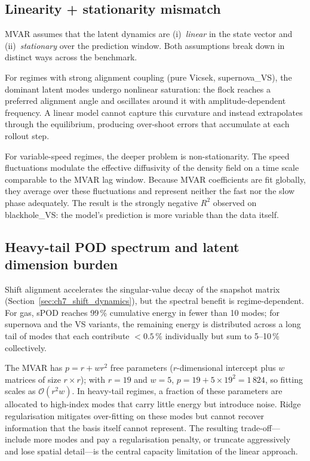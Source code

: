 \subsection{Linearity + stationarity mismatch}

MVAR assumes that the latent dynamics are (i)~\emph{linear} in the
state vector and (ii)~\emph{stationary} over the prediction window.
Both assumptions break down in distinct ways across the benchmark.

For regimes with strong alignment coupling (pure Vicsek,
supernova\_VS), the dominant latent modes undergo nonlinear saturation:
the flock reaches a preferred alignment angle and oscillates around it
with amplitude-dependent frequency.  A linear model cannot capture this
curvature and instead extrapolates through the equilibrium, producing
over-shoot errors that accumulate at each rollout step.

For variable-speed regimes, the deeper problem is non-stationarity.
The speed fluctuations modulate the effective diffusivity of the
density field on a time scale comparable to the MVAR lag window.
Because MVAR coefficients are fit globally, they average over these
fluctuations and represent neither the fast nor the slow phase
adequately.  The result is the strongly negative $R^2$ observed on
blackhole\_VS: the model's prediction is more variable than the data
itself.

\subsection{Heavy-tail POD spectrum and latent dimension burden}

Shift alignment accelerates the singular-value decay of the snapshot
matrix (Section~\ref{sec:ch7_shift_dynamics}), but the spectral benefit
is regime-dependent.  For gas, sPOD reaches 99\,\% cumulative energy in
fewer than 10 modes; for supernova and the VS variants, the remaining
energy is distributed across a long tail of modes that each contribute
$<0.5\,\%$ individually but sum to 5--10\,\% collectively.

The MVAR has $p = r + wr^2$ free parameters ($r$-dimensional intercept
plus $w$ matrices of size $r\times r$); with $r=19$ and $w=5$,
$p = 19 + 5\times19^2 = 1\,824$, so fitting scales as $\mathcal{O}(r^2 w)$.
In heavy-tail regimes, a fraction of these parameters are
allocated to high-index modes that carry little energy but introduce
noise.  Ridge regularisation mitigates over-fitting on these modes but
cannot recover information that the basis itself cannot represent.  The
resulting trade-off---include more modes and pay a regularisation
penalty, or truncate aggressively and lose spatial detail---is the
central capacity limitation of the linear approach.

